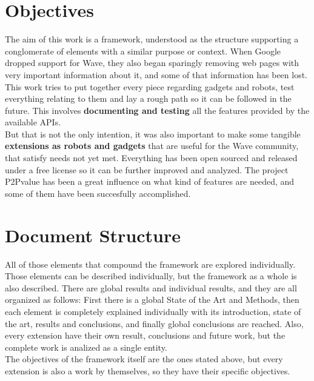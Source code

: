 \section{Objectives}
The aim of this work is a framework, understood as the structure supporting a conglomerate of elements with a similar purpose or context. When Google dropped support for Wave, they also began sparingly removing web pages with very important information about it, and some of that information has been lost. This work tries to put together every piece regarding gadgets and robots, test everything relating to them and lay a rough path so it can be followed in the future. This involves \textbf{documenting and testing} all the features provided by the available APIs.\\[.2cm]
But that is not the only intention, it was also important to make some tangible \textbf{extensions as robots and gadgets} that are useful for the Wave community, that satisfy needs not yet met. Everything has been open sourced and released under a free license \cite{ref:agpl} so it can be further improved and analyzed. The project P2Pvalue \cite{ref:p2pvalue} has been a great influence on what kind of features are needed, and some of them have been succesfully accomplished.

\section{Document Structure}
All of those elements that compound the framework are explored individually. Those elements can be described individually, but the framework as a whole is also described. There are global results and individual results, and they are all organized as follows: First there is a global State of the Art and Methods, then each element is completely explained individually with its introduction, state of the art, results and conclusions, and finally global conclusions are reached. Also, every extension have their own result, conclusions and future work, but the complete work is analized as a single entity.\\[.2cm]
The objectives of the framework itself are the ones stated above, but every extension is also a work by themselves, so they have their specific objectives.\\[.2cm]
